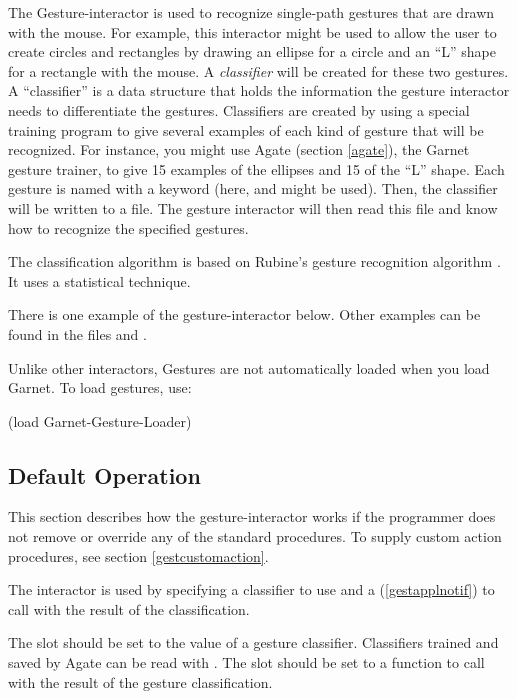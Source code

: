 The Gesture-interactor is used to recognize single-path gestures that are
drawn with the mouse.  For example, this interactor might be used to allow
the user to create circles and rectangles by drawing an ellipse for a
circle and an ``L'' shape for a rectangle with the mouse.  A
{\it classifier} will be created for these two gestures.  A
``classifier'' is a data structure that holds the information the
gesture interactor needs to differentiate the gestures.  Classifiers
are created by using a special training program to give several
examples of each kind of gesture that will be recognized.  For
instance, you might use Agate (section \ref{agate}), the Garnet
gesture trainer, to give 15 examples of the ellipses and 15 of the ``L''
shape.
Each gesture is named with a keyword (here,  and 
might be used).
Then, the classifier will be written to a file.  The gesture
interactor will then read this file and know how to recognize the
specified gestures.

The classification algorithm is based on Rubine's gesture
recognition algorithm \cite{rubine, rubinesiggraph}.  It uses a
statistical technique.

There is one example of the gesture-interactor below. Other
examples can be found in the files  and
.

Unlike other interactors, Gestures are not automatically loaded when
you load Garnet.  To load gestures, use:
\begin{programexample}
(load Garnet-Gesture-Loader)
\end{programexample}


\subsection{Default Operation}

This section describes how the gesture-interactor works
if the programmer does not remove or override any of the standard
 procedures.  To supply custom action procedures, see section
\ref{gestcustomaction}.

The interactor is used by specifying a classifier to use and a
 (\ref{gestapplnotif}) to call with the result of the
classification.

The  slot should be set to the value of a gesture
classifier.  Classifiers trained and saved by Agate can be read with
.  The 
slot should be set to a function to call with the result of the gesture
classification.

